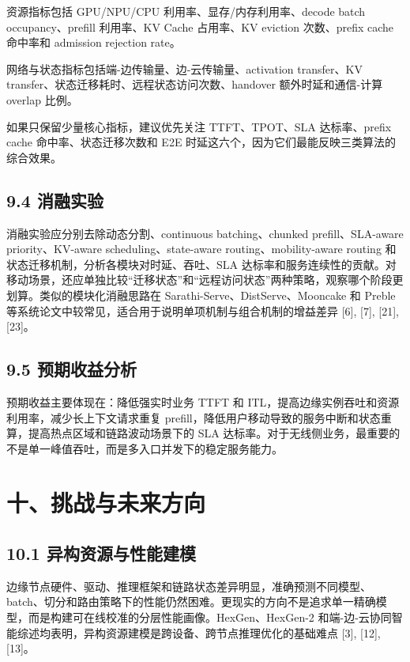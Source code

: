\documentclass[a4paper,twocolumn,10pt]{ctexart}
\begin{document}
资源指标包括 GPU/NPU/CPU 利用率、显存/内存利用率、decode batch occupancy、prefill 利用率、KV Cache 占用率、KV eviction 次数、prefix cache 命中率和 admission rejection rate。


网络与状态指标包括端-边传输量、边-云传输量、activation transfer、KV transfer、状态迁移耗时、远程状态访问次数、handover 额外时延和通信-计算 overlap 比例。


如果只保留少量核心指标，建议优先关注 TTFT、TPOT、SLA 达标率、prefix cache 命中率、状态迁移次数和 E2E 时延这六个，因为它们最能反映三类算法的综合效果。


\subsection{9.4 消融实验}

消融实验应分别去除动态分割、continuous batching、chunked prefill、SLA-aware priority、KV-aware scheduling、state-aware routing、mobility-aware routing 和状态迁移机制，分析各模块对时延、吞吐、SLA 达标率和服务连续性的贡献。对移动场景，还应单独比较“迁移状态”和“远程访问状态”两种策略，观察哪个阶段更划算。类似的模块化消融思路在 Sarathi-Serve、DistServe、Mooncake 和 Preble 等系统论文中较常见，适合用于说明单项机制与组合机制的增益差异 [6], [7], [21], [23]。


\subsection{9.5 预期收益分析}

预期收益主要体现在：降低强实时业务 TTFT 和 ITL，提高边缘实例吞吐和资源利用率，减少长上下文请求重复 prefill，降低用户移动导致的服务中断和状态重算，提高热点区域和链路波动场景下的 SLA 达标率。对于无线侧业务，最重要的不是单一峰值吞吐，而是多入口并发下的稳定服务能力。


\section{十、挑战与未来方向}

\subsection{10.1 异构资源与性能建模}

边缘节点硬件、驱动、推理框架和链路状态差异明显，准确预测不同模型、batch、切分和路由策略下的性能仍然困难。更现实的方向不是追求单一精确模型，而是构建可在线校准的分层性能画像。HexGen、HexGen-2 和端-边-云协同智能综述均表明，异构资源建模是跨设备、跨节点推理优化的基础难点 [3], [12], [13]。
\end{document}
